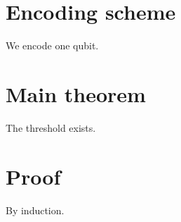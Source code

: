 \documentclass{article}
\begin{document}
\section{Encoding scheme}
We encode one qubit.
\section{Main theorem}
The threshold exists.
\section{Proof}
By induction.

\end{document}
